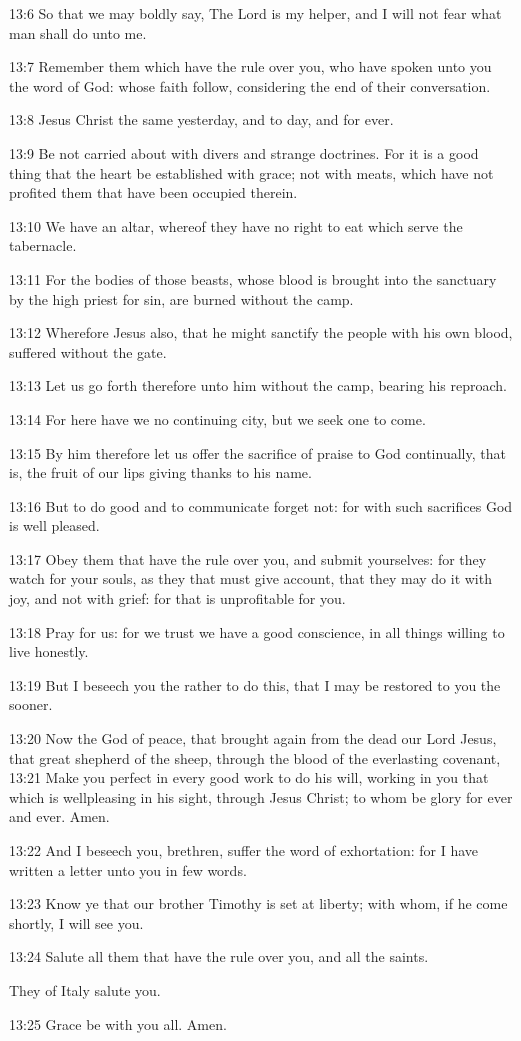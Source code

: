 13:6 So that we may boldly say, The Lord is my helper, and I will not fear what man shall do unto me.

13:7 Remember them which have the rule over you, who have spoken unto you the word of God: whose faith follow, considering the end of their conversation.

13:8 Jesus Christ the same yesterday, and to day, and for ever.

13:9 Be not carried about with divers and strange doctrines. For it is a good thing that the heart be established with grace; not with meats, which have not profited them that have been occupied therein.

13:10 We have an altar, whereof they have no right to eat which serve the tabernacle.

13:11 For the bodies of those beasts, whose blood is brought into the sanctuary by the high priest for sin, are burned without the camp.

13:12 Wherefore Jesus also, that he might sanctify the people with his own blood, suffered without the gate.

13:13 Let us go forth therefore unto him without the camp, bearing his reproach.

13:14 For here have we no continuing city, but we seek one to come.

13:15 By him therefore let us offer the sacrifice of praise to God continually, that is, the fruit of our lips giving thanks to his name.

13:16 But to do good and to communicate forget not: for with such sacrifices God is well pleased.

13:17 Obey them that have the rule over you, and submit yourselves: for they watch for your souls, as they that must give account, that they may do it with joy, and not with grief: for that is unprofitable for you.

13:18 Pray for us: for we trust we have a good conscience, in all things willing to live honestly.

13:19 But I beseech you the rather to do this, that I may be restored to you the sooner.

13:20 Now the God of peace, that brought again from the dead our Lord Jesus, that great shepherd of the sheep, through the blood of the everlasting covenant, 13:21 Make you perfect in every good work to do his will, working in you that which is wellpleasing in his sight, through Jesus Christ; to whom be glory for ever and ever. Amen.

13:22 And I beseech you, brethren, suffer the word of exhortation: for I have written a letter unto you in few words.

13:23 Know ye that our brother Timothy is set at liberty; with whom, if he come shortly, I will see you.

13:24 Salute all them that have the rule over you, and all the saints.

They of Italy salute you.

13:25 Grace be with you all. Amen.

